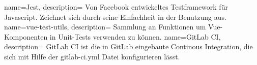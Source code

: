  {
  name=Jest,
  description={
    Von Facebook entwickeltes Testframework für Javascript. Zeichnet sich durch seine Einfachheit in der Benutzung aus.
  }
}
 {
  name=vue-test-utils,
  description={
    Sammlung an Funktionen um Vue-Komponenten in Unit-Tests verwenden zu können.
  }
}
 {
	name=GitLab CI,
	description={
		GitLab CI ist die in GitLab eingebaute Continous Integration, die sich mit Hilfe der gitlab-ci.yml Datei konfigurieren lässt.
	}
}